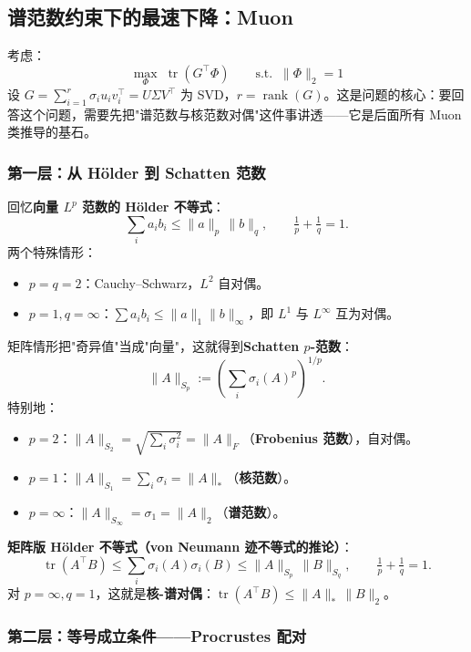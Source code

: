 \documentclass[11pt,a4paper]{article}
\theoremstyle{mythm}
\theoremstyle{mydef}
\newcommand{\tr}{\operatorname{tr}}
\newcommand{\rank}{\operatorname{rank}}
\begin{document}
\subsection{谱范数约束下的最速下降：Muon}

考虑：
\begin{equation}\label{eq:muon-base}
\max_\Phi\; \tr(G^\top \Phi) \qquad \text{s.t.}\;\; \|\Phi\|_2 = 1
\end{equation}
设 $G = \sum_{i=1}^r \sigma_i u_i v_i^\top = U\Sigma V^\top$ 为 SVD，$r=\rank(G)$。这是问题的核心：要回答这个问题，需要先把"谱范数与核范数对偶"这件事讲透——它是后面所有 Muon 类推导的基石。

\subsubsection*{第一层：从 Hölder 到 Schatten 范数}

回忆\textbf{向量 $L^p$ 范数的 Hölder 不等式}：
$$\sum_i a_i b_i \le \|a\|_p\,\|b\|_q,\qquad \tfrac{1}{p}+\tfrac{1}{q}=1.$$
两个特殊情形：
\begin{itemize}[leftmargin=2em]
\item $p=q=2$：Cauchy--Schwarz，$L^2$ 自对偶。
\item $p=1, q=\infty$：$\sum a_i b_i \le \|a\|_1 \|b\|_\infty$，即 $L^1$ 与 $L^\infty$ 互为对偶。
\end{itemize}

矩阵情形把"奇异值"当成"向量"，这就得到\textbf{Schatten $p$-范数}：
$$\|A\|_{S_p} := \left(\sum_i \sigma_i(A)^p\right)^{1/p}.$$
特别地：
\begin{itemize}[leftmargin=2em]
\item $p=2$：$\|A\|_{S_2} = \sqrt{\sum_i\sigma_i^2} = \|A\|_F$（\textbf{Frobenius 范数}），自对偶。
\item $p=1$：$\|A\|_{S_1} = \sum_i\sigma_i = \|A\|_*$（\textbf{核范数}）。
\item $p=\infty$：$\|A\|_{S_\infty} = \sigma_1 = \|A\|_2$（\textbf{谱范数}）。
\end{itemize}

\textbf{矩阵版 Hölder 不等式（von Neumann 迹不等式的推论）}：
\begin{equation}\label{eq:matrix-holder}
\boxed{\quad \tr(A^\top B) \le \sum_i \sigma_i(A)\sigma_i(B) \le \|A\|_{S_p}\,\|B\|_{S_q},\qquad \tfrac{1}{p}+\tfrac{1}{q}=1.\quad}
\end{equation}
对 $p=\infty, q=1$，这就是\textbf{核-谱对偶}：$\tr(A^\top B) \le \|A\|_*\,\|B\|_2$。

\subsubsection*{第二层：等号成立条件——Procrustes 配对}
\end{document}
